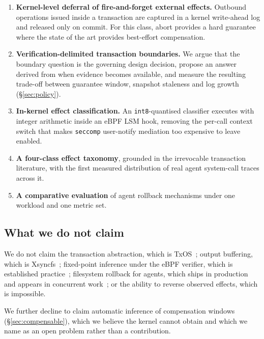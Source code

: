 \documentclass[10pt,twocolumn]{article}
\begin{document}
\begin{enumerate}\itemsep2pt
\item \textbf{Kernel-level deferral of fire-and-forget external effects.}
      Outbound operations issued inside a transaction are captured in a kernel
      write-ahead log and released only on commit. For this class, abort
      provides a hard guarantee where the state of the art provides best-effort
      compensation.
\item \textbf{Verification-delimited transaction boundaries.} We argue that the
      boundary question is the governing design decision, propose an answer
      derived from when evidence becomes available, and measure the resulting
      trade-off between guarantee window, snapshot staleness and log growth
      (\S\ref{sec:policy}).
\item \textbf{In-kernel effect classification.} An \texttt{int8}-quantised
      classifier executes with integer arithmetic inside an eBPF LSM hook,
      removing the per-call context switch that makes \texttt{seccomp}
      user-notify mediation too expensive to leave enabled.
\item \textbf{A four-class effect taxonomy}, grounded in the irrevocable
      transaction literature, with the first measured distribution of real agent
      system-call traces across it.
\item \textbf{A comparative evaluation} of agent rollback mechanisms under one
      workload and one metric set.
\end{enumerate}

\subsection{What we do not claim}
\label{sec:nonclaims}

We do not claim the transaction abstraction, which is
TxOS~\cite{porter2009txos}; output buffering, which is
Xsyncfs~\cite{nightingale2006xsyncfs}; fixed-point inference under the eBPF
verifier, which is established
practice~\cite{ebpffixedpoint2024,kernelpacketml2024,akgun2023kml}; filesystem
rollback for agents, which ships in production and appears in concurrent
work~\cite{ccrewind,ftsandbox2025,deltabox2026}; or the ability to reverse
observed effects, which is impossible.

We further decline to claim automatic inference of compensation windows
(\S\ref{sec:compensable}), which we believe the kernel cannot obtain and which
we name as an open problem rather than a contribution.
\end{document}
